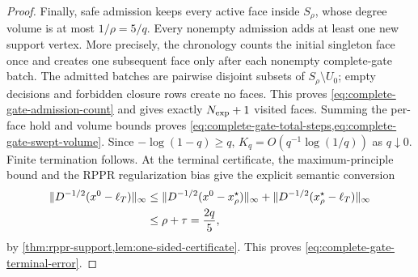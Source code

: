 \begin{proof}
Finally, safe admission keeps every active face inside $S_\rho$, whose degree
volume is at most $1/\rho=5/q$.  Every nonempty admission adds at least one
new support vertex.  More precisely, the chronology counts the initial
singleton face once and creates one subsequent face only after each nonempty
complete-gate batch.  The admitted batches are pairwise disjoint subsets of
$S_\rho\setminus U_0$; empty decisions and forbidden closure rows create no
faces.  This proves \cref{eq:complete-gate-admission-count} and gives exactly
$N_{\rm exp}+1$ visited faces.  Summing the per-face hold and volume bounds proves
\cref{eq:complete-gate-total-steps,eq:complete-gate-swept-volume}.  Since
$-\log(1-q)\geq q$, $K_q=O(q^{-1}\log(1/q))$ as $q\downarrow0$.  Finite
termination follows.  At the terminal certificate, the maximum-principle
bound and the RPPR regularization bias give the explicit semantic conversion
\begin{align*}
 \lVert D^{-1/2}(x^0-\ell_T)\rVert_\infty
 &\leq
 \lVert D^{-1/2}(x^0-x_\rho^\star)\rVert_\infty
 +\lVert D^{-1/2}(x_\rho^\star-\ell_T)\rVert_\infty\\
 &\leq\rho+\tau=\frac{2q}{5},
\end{align*}
by \cref{thm:rppr-support,lem:one-sided-certificate}.  This proves
\cref{eq:complete-gate-terminal-error}.
\end{proof}


